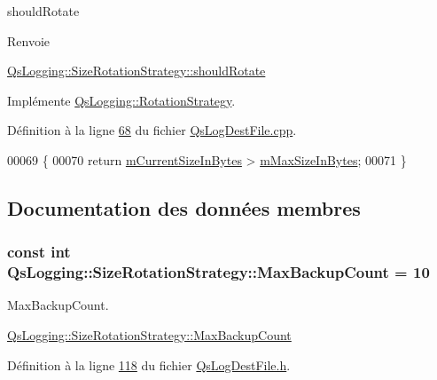 should\-Rotate 

\begin{DoxyReturn}{Renvoie}

\end{DoxyReturn}
\hyperlink{classQsLogging_1_1SizeRotationStrategy_aced9d2191e48ae60f039d62fd9c7197f}{Qs\-Logging\-::\-Size\-Rotation\-Strategy\-::should\-Rotate} 

Implémente \hyperlink{classQsLogging_1_1RotationStrategy_a53136a1009e8a0b30956ea83c43c4973}{Qs\-Logging\-::\-Rotation\-Strategy}.



Définition à la ligne \hyperlink{QsLogDestFile_8cpp_source_l00068}{68} du fichier \hyperlink{QsLogDestFile_8cpp_source}{Qs\-Log\-Dest\-File.\-cpp}.


\begin{DoxyCode}
00069 \{
00070     \textcolor{keywordflow}{return} \hyperlink{classQsLogging_1_1SizeRotationStrategy_a655f57a77d5e6384c49a2dffd899ef33}{mCurrentSizeInBytes} > \hyperlink{classQsLogging_1_1SizeRotationStrategy_ab9b1ed9b39de4c90762f38a32935fe01}{mMaxSizeInBytes};
00071 \}
\end{DoxyCode}


\subsection{Documentation des données membres}
\hypertarget{classQsLogging_1_1SizeRotationStrategy_a9965384f7b98b191d00eef62b2b417bf}{
\subsubsection[{Max\-Backup\-Count}]{\setlength{\rightskip}{0pt plus 5cm}const int Qs\-Logging\-::\-Size\-Rotation\-Strategy\-::\-Max\-Backup\-Count = 10\hspace{0.3cm}{\ttfamily [static]}}}\label{classQsLogging_1_1SizeRotationStrategy_a9965384f7b98b191d00eef62b2b417bf}


Max\-Backup\-Count. 

\hyperlink{classQsLogging_1_1SizeRotationStrategy_a9965384f7b98b191d00eef62b2b417bf}{Qs\-Logging\-::\-Size\-Rotation\-Strategy\-::\-Max\-Backup\-Count} 

Définition à la ligne \hyperlink{QsLogDestFile_8h_source_l00118}{118} du fichier \hyperlink{QsLogDestFile_8h_source}{Qs\-Log\-Dest\-File.\-h}.



